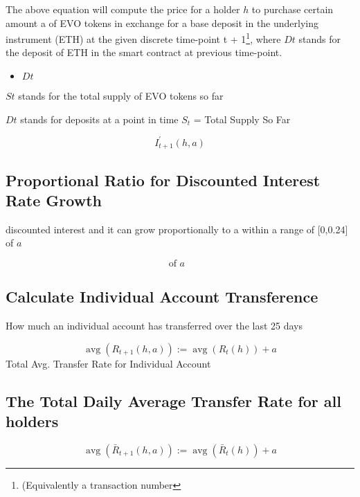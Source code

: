 The above equation will compute the price for a holder $h$ to purchase
certain amount a of EVO tokens in exchange for a base deposit in the underlying instrument (ETH) at the given discrete time-point {t + 1}\footnote{(Equivalently a transaction
number}, where $Dt$ stands for the deposit of ETH in the smart contract at previous time-point.

\begin{itemize}
	\item $Dt$
\end{itemize}


\label{total.supply.minted-evo}
$St$ stands for the total supply of EVO tokens so far

\label{deposits.discrete}
$Dt$  stands for deposits at a point in time 
\newline
\label{total.supply.so-far}
$S_t$ = Total Supply So Far

\begin{equation}
	I_{t+1}^{\prime}(h, a)
\end{equation}

\newpage

\subsection{Proportional Ratio for Discounted Interest Rate Growth}
discounted interest and it can grow proportionally to a within
a range of [0,0.24] of $a$

\label{discounted.interest.range}
\begin{equation}
	[0,0.24] \text{of $a$ }
\end{equation}

\subsection{Calculate Individual Account Transference}
How much an individual account has transferred over the last 25 days 

\label{total.individual.avg.transfer.rate}
\begin{equation}
	\operatorname{avg}\left(R_{t+1}(h, a)\right):=\operatorname{avg}\left(R_{t}(h)\right)+a
\end{equation}
Total Avg. Transfer Rate for Individual Account
\newline



\begin{tcolorbox}
	\subsection{The Total Daily Average Transfer Rate for all holders }
	\label{total.aggregate.daily.avg.transfer.rate}
	\begin{equation}
		\operatorname{avg}\left(\bar{R}_{t+1}(h, a)\right):=\operatorname{avg}\left(\bar{R}_{t}(h)\right)+a
	\end{equation}
\end{tcolorbox}

